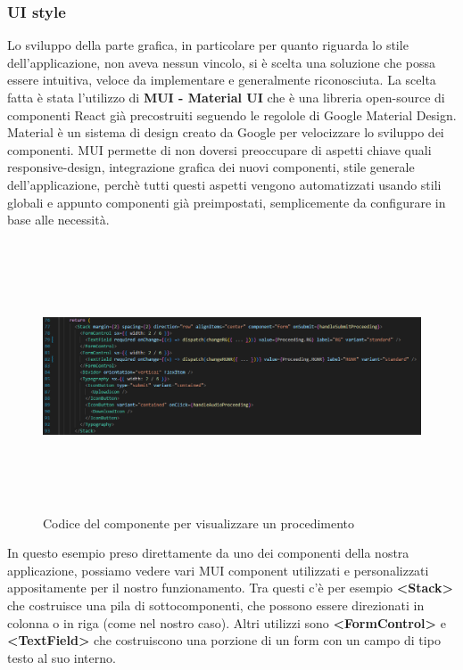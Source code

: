 \subsubsection{UI style}
Lo sviluppo della parte grafica, in particolare per quanto riguarda lo stile dell'applicazione, non aveva nessun vincolo, si è scelta una soluzione che possa essere intuitiva,
veloce da implementare e generalmente riconosciuta. La scelta fatta è stata l'utilizzo di \textbf{MUI - Material UI} che è una libreria open-source di componenti React già precostruiti
seguendo le regolole di Google Material Design. Material è un sistema di design creato da Google per velocizzare lo sviluppo dei componenti. MUI permette di non doversi preoccupare
di aspetti chiave quali responsive-design, integrazione grafica dei nuovi componenti, stile generale dell'applicazione, perchè tutti questi aspetti vengono automatizzati usando
stili globali e appunto componenti già preimpostati, semplicemente da configurare in base alle necessità.

\begin{figure}[H]
  \centering
  \includegraphics[width=\textwidth, height=8cm]{immagini/proceedingCard-MUI.png}
  \caption{Codice del componente per visualizzare un procedimento}
\end{figure}

In questo esempio preso direttamente da uno dei componenti della nostra applicazione, possiamo vedere vari MUI component utilizzati e personalizzati appositamente per il
nostro funzionamento. Tra questi c'è per esempio \textbf{<Stack>} che costruisce una pila di sottocomponenti, che possono essere direzionati in colonna o in riga (come nel nostro caso).
Altri utilizzi sono \textbf{<FormControl>} e \textbf{<TextField>} che costruiscono una porzione di un form con un campo di tipo testo al suo interno.


